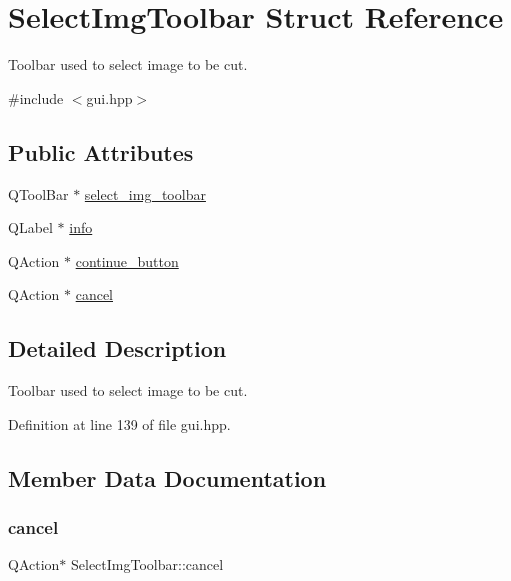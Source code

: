 \hypertarget{structSelectImgToolbar}{}\section{Select\+Img\+Toolbar Struct Reference}
\label{structSelectImgToolbar}


Toolbar used to select image to be cut.  




{\ttfamily \#include $<$gui.\+hpp$>$}

\subsection*{Public Attributes}
\begin{DoxyCompactItemize}
\item 
Q\+Tool\+Bar $\ast$ \mbox{\hyperlink{structSelectImgToolbar_a779bc326cf08c9fbcd1ffebb43a664eb}{select\+\_\+img\+\_\+toolbar}}
\item 
Q\+Label $\ast$ \mbox{\hyperlink{structSelectImgToolbar_a3cf6ac92fbe60877873c89939217e1de}{info}}
\item 
Q\+Action $\ast$ \mbox{\hyperlink{structSelectImgToolbar_a82569764f9d7e13b406a668e9e50290a}{continue\+\_\+button}}
\item 
Q\+Action $\ast$ \mbox{\hyperlink{structSelectImgToolbar_a0b17a222dff0441c0f10509315ce9052}{cancel}}
\end{DoxyCompactItemize}


\subsection{Detailed Description}
Toolbar used to select image to be cut. 

Definition at line 139 of file gui.\+hpp.



\subsection{Member Data Documentation}
\mbox{\label{structSelectImgToolbar_a0b17a222dff0441c0f10509315ce9052}} 
\subsubsection{\texorpdfstring{cancel}{cancel}}
{\footnotesize\ttfamily Q\+Action$\ast$ Select\+Img\+Toolbar\+::cancel}

